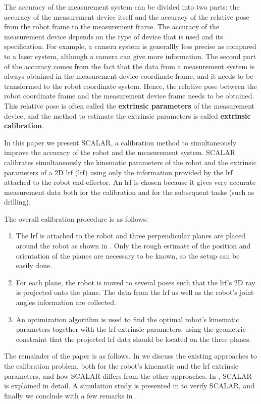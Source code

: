 The accuracy of the measurement system can be divided into two parts: the accuracy of the measurement device itself and the accuracy of the relative pose from the robot frame to the measurement frame. The accuracy of the measurement device depends on the type of device that is used and its specification. For example, a camera system is generallly less precise as compared to a laser system, although a camera can give more information. The second part of the accuracy comes from the fact that the data from a measurement system is always obtained in the measurement device coordinate frame, and it needs to be transformed to the robot coordinate system. Hence, the relative pose between the robot coordinate frame and the measurement device frame needs to be obtained. This relative pose is often called the \textbf{extrinsic parameters} of the measurement device, and the method to estimate the extrinsic parameters is called \textbf{extrinsic calibration}.  


In this paper we present SCALAR, a calibration method to simultaneously improve the accuracy of the robot and the measurement system. SCALAR calibrates simultaneously the kinematic parameters of the robot and the extrinsic parameters of a 2D \acl{lrf} (\ac{lrf}) using only the information provided by the \ac{lrf} attached to the robot end-effector. An \ac{lrf} is chosen because it gives very accurate measurement data both for the calibration and for the subsequent tasks (such as drilling).  

The overall calibration procedure is as follows:
\begin{enumerate}
\item The \ac{lrf} is attached to the robot and three perpendicular planes are placed around the robot as shown in . Only the rough estimate of the position and orientation of the planes are necessary to be known, so the setup can be easily done.
\item For each plane, the robot is moved to several poses such that the \ac{lrf}'s 2D ray is projected onto the plane. The data from the \ac{lrf} as well as the robot's joint angles information are collected.
\item An optimization algorithm is used to find the optimal robot's kinematic parameters together with the \ac{lrf} extrinsic parameters, using the geometric constraint that the projected \ac{lrf} data should be located on the three planes. 
\end{enumerate}

The remainder of the paper is as follows. In  we discuss the existing approaches to the calibration problem, both for the robot's kinematic and the \ac{lrf} extrinsic parameters, and how SCALAR differs from the other approaches. In , SCALAR is explained in detail. A simulation study is presented in  to verify SCALAR, and finally we conclude with a few remarks in .  



